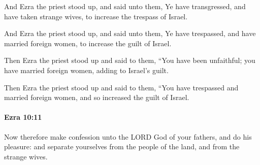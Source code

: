 			And Ezra the priest stood up, and said unto them, Ye have transgressed, and have taken strange wives, to increase the trespass of Israel.

			\begin{versebox}
					\item[BHS] 
					\item[LXX] 
					\item[ASV] And Ezra the priest stood up, and said unto them, Ye have trespassed, and have married foreign women, to increase the guilt of Israel.
					\item[NIV] Then Ezra the priest stood up and said to them, “You have been unfaithful; you have married foreign women, adding to Israel’s guilt.
					\item[NRSV] Then Ezra the priest stood up and said to them, “You have trespassed and married foreign women, and so increased the guilt of Israel.
			\end{versebox}

		\paragraph{Ezra 10:11} %
			\label{EZRA-10-11}

			Now therefore make confession unto the LORD God of your fathers, and do his pleasure: and separate yourselves from the people of the land, and from the strange wives.

